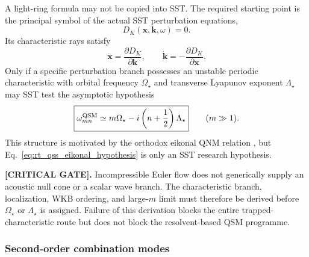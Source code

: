         A light-ring formula may not be copied into SST.  The required starting point is
        the principal symbol of the actual SST perturbation equations,
        \begin{equation}
            D_K(\mathbf x,\mathbf k,\omega)=0.
            \label{eq:rt_qss_principal_symbol}
        \end{equation}
        Its characteristic rays satisfy
        \begin{equation}
            \dot{\mathbf x}
            =
            \frac{\partial D_K}{\partial\mathbf k},
            \qquad
            \dot{\mathbf k}
            =
            -\frac{\partial D_K}{\partial\mathbf x}.
            \label{eq:rt_qss_characteristic_rays}
        \end{equation}
        Only if a specific perturbation branch possesses an unstable periodic
        characteristic with orbital frequency \(\Omega_\star\) and transverse
        Lyapunov exponent \(\Lambda_\star\) may SST test the asymptotic hypothesis
        \begin{equation}
            \boxed{
                \omega_{mn}^{\rm QSM}
                \simeq
                m\Omega_\star
                -
                i\left(n+\frac12\right)\Lambda_\star
            }
            \qquad
            (m\gg1).
            \label{eq:rt_qss_eikonal_hypothesis}
        \end{equation}
        This structure is motivated by the orthodox eikonal QNM relation
        \cite{CardosoMirandaBertiWitekZanchin2009,
        BertiEtAl2026BlackHoleSpectroscopy}, but Eq.~\eqref{eq:rt_qss_eikonal_hypothesis}
        is only an SST research hypothesis.

        \textbf{[CRITICAL GATE].}
        Incompressible Euler flow does not generically supply an acoustic null cone or
        a scalar wave branch.  The characteristic branch, localization, WKB ordering,
        and large-\(m\) limit must therefore be derived before
        \(\Omega_\star\) or \(\Lambda_\star\) is assigned.  Failure of this derivation
        blocks the entire trapped-characteristic route but does not block the
        resolvent-based QSM programme.

    \subsubsection*{Second-order combination modes}

